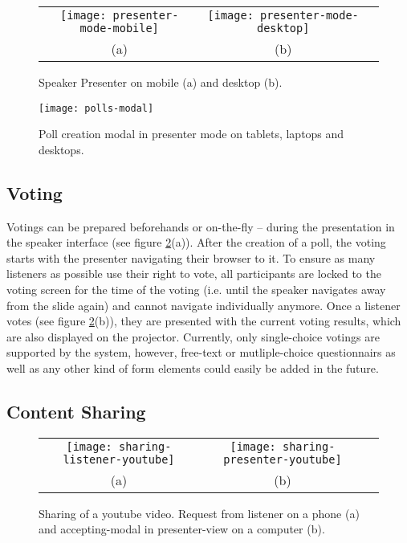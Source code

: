 \begin{figure}
\centering
\begin{tabular}{ccc}
\texttt{[image: presenter-mode-mobile]} &
\texttt{[image: presenter-mode-desktop]} \\
(a) & (b)
\end{tabular}
\caption{Speaker Presenter on mobile (a) and desktop (b).}
\label{fig:results-user-speaker-presenter}
\end{figure}

\begin{figure}
\centering
\texttt{[image: polls-modal]}
\caption{Poll creation modal in presenter mode on tablets, laptops and desktops.}
\label{fig:results-user-polls-modal}
\end{figure}

\subsection{Voting}
Votings can be prepared beforehands or on-the-fly -- during the presentation in the speaker interface (see figure \ref{fig:results-user-polls-modal}(a)). After the creation of a poll, the voting starts with the presenter navigating their browser to it.
To ensure as many listeners as possible use their right to vote, all participants are locked to the voting screen for the time of the voting (i.e. until the speaker navigates away from the slide again) and cannot navigate individually anymore. Once a listener votes (see figure \ref{fig:results-user-polls-modal}(b)), they are presented with the current voting results, which are also displayed on the projector. Currently, only single-choice votings are supported by the system, however, free-text or mutliple-choice questionnairs as well as any other kind of form elements could easily be added in the future.

\subsection{Content Sharing}

\begin{figure}
\centering
\begin{tabular}{ccc}
\texttt{[image: sharing-listener-youtube]} &
\texttt{[image: sharing-presenter-youtube]} \\
(a) & (b)
\end{tabular}
\caption{Sharing of a youtube video. Request from listener on a phone (a) and accepting-modal in presenter-view on a computer (b).}
\label{fig:results-user-sharing-youtube}
\end{figure}

